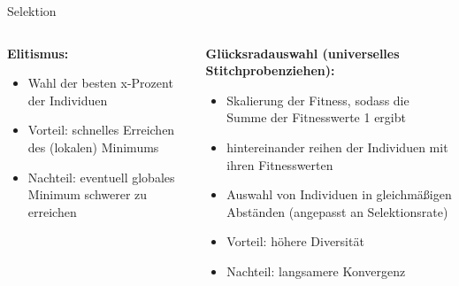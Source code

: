\begin{frame}{Selektion}
    \begin{columns}[T] %
        \begin{column}{0.4\textwidth}
            \textbf{Elitismus:}
            \begin{itemize}
                \item Wahl der besten x-Prozent der Individuen
                \item Vorteil: schnelles Erreichen des (lokalen) Minimums
                \item Nachteil: eventuell globales Minimum schwerer zu erreichen
            \end{itemize}
        \end{column}
        \begin{column}{0.6\textwidth}
            \textbf{Glücksradauswahl (universelles Stitchprobenziehen):}
            \begin{itemize}
                \item Skalierung der Fitness, sodass die Summe der
                Fitnesswerte 1 ergibt
                \item hintereinander reihen der Individuen mit ihren Fitnesswerten
                \item Auswahl von Individuen in gleichmäßigen Abständen (angepasst an Selektionsrate)
                \item Vorteil: höhere Diversität
                \item Nachteil: langsamere Konvergenz
            \end{itemize}
        \end{column}
    \end{columns}
\end{frame}